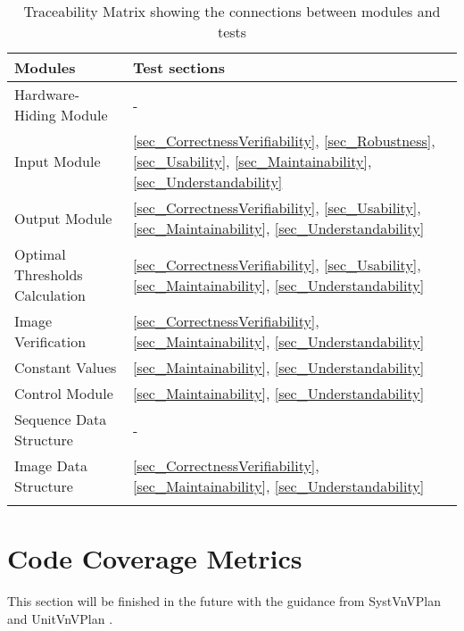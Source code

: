 \documentclass[12pt, titlepage]{article}
\begin{document}
\begin{longtable}{l l}
\toprule
Modules \cite{Dong2019MIS} & Test sections\\
\midrule
Hardware-Hiding Module & - \\
Input Module & \ref{sec_CorrectnessVerifiability}, \ref{sec_Robustness},
\ref{sec_Usability}, \ref{sec_Maintainability}, \ref{sec_Understandability}\\
Output Module & \ref{sec_CorrectnessVerifiability}, \ref{sec_Usability},
\ref{sec_Maintainability}, \ref{sec_Understandability}\\
Optimal Thresholds Calculation & \ref{sec_CorrectnessVerifiability},
\ref{sec_Usability}, \ref{sec_Maintainability}, \ref{sec_Understandability}\\
Image Verification & \ref{sec_CorrectnessVerifiability},
\ref{sec_Maintainability}, \ref{sec_Understandability}\\
Constant Values & \ref{sec_Maintainability}, \ref{sec_Understandability} \\
Control Module & \ref{sec_Maintainability}, \ref{sec_Understandability} \\
Sequence Data Structure & - \\
Image Data Structure & \ref{sec_CorrectnessVerifiability},
\ref{sec_Maintainability}, \ref{sec_Understandability}\\
\bottomrule
\caption{Traceability Matrix showing the connections between modules and
tests}
\label{Tb_traceModules}
\end{longtable}

\section{Code Coverage Metrics}

This section will be finished in the future with the guidance from SystVnVPlan
\cite{Dong2019SystVnV} and UnitVnVPlan \cite{Dong2019UnitVnV}.

\newpage




\end{document}

